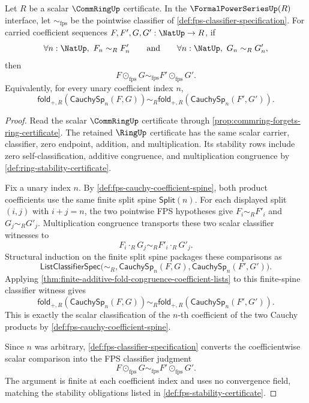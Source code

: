 \begin{theorem}
\label{thm:fps-cauchy-product-classifier-congruence}
Let $R$ be a scalar $\CommRingUp$ certificate. In the $\FormalPowerSeriesUp(R)$ interface, let $\sim_{\mathrm{fps}}$ be the pointwise classifier of \autoref{def:fps-classifier-specification}. For carried coefficient sequences $F,F',G,G':\NatUp\to R$, if
$$
\forall n:\NatUp,\ F_n\sim_R F'_n
\qquad\text{and}\qquad
\forall n:\NatUp,\ G_n\sim_R G'_n,
$$
then
$$
F\odot_{\mathrm{fps}}G\sim_{\mathrm{fps}}F'\odot_{\mathrm{fps}}G'.
$$
Equivalently, for every unary coefficient index $n$,
$$
\mathsf{fold}_{+,R}(\mathsf{CauchySp}_n(F,G))
\sim_R
\mathsf{fold}_{+,R}(\mathsf{CauchySp}_n(F',G')).
$$
\end{theorem}
\begin{proof}
Read the scalar $\CommRingUp$ certificate through \autoref{prop:commring-forgets-ring-certificate}. The retained $\RingUp$ certificate has the same scalar carrier, classifier, zero endpoint, addition, and multiplication. Its stability rows include zero self-classification, additive congruence, and multiplication congruence by \autoref{def:ring-stability-certificate}.

Fix a unary index $n$. By \autoref{def:fps-cauchy-coefficient-spine}, both product coefficients use the same finite split spine $\mathsf{Split}(n)$. For each displayed split $(i,j)$ with $i+j=n$, the two pointwise FPS hypotheses give $F_i\sim_R F'_i$ and $G_j\sim_R G'_j$. Multiplication congruence transports these two scalar classifier witnesses to
$$
F_i\cdot_R G_j\sim_R F'_i\cdot_R G'_j.
$$
Structural induction on the finite split spine packages these comparisons as
$$
\mathsf{ListClassifierSpec}\bigl(\sim_R,\mathsf{CauchySp}_n(F,G),\mathsf{CauchySp}_n(F',G')\bigr).
$$
Applying \autoref{thm:finite-additive-fold-congruence-coefficient-lists} to this finite-spine classifier witness gives
$$
\mathsf{fold}_{+,R}(\mathsf{CauchySp}_n(F,G))
\sim_R
\mathsf{fold}_{+,R}(\mathsf{CauchySp}_n(F',G')).
$$
This is exactly the scalar classification of the $n$-th coefficient of the two Cauchy products by \autoref{def:fps-cauchy-coefficient-spine}.

Since $n$ was arbitrary, \autoref{def:fps-classifier-specification} converts the coefficientwise scalar comparison into the FPS classifier judgment
$$
F\odot_{\mathrm{fps}}G\sim_{\mathrm{fps}}F'\odot_{\mathrm{fps}}G'.
$$
The argument is finite at each coefficient index and uses no convergence field, matching the stability obligations listed in \autoref{def:fps-stability-certificate}.
\end{proof}

